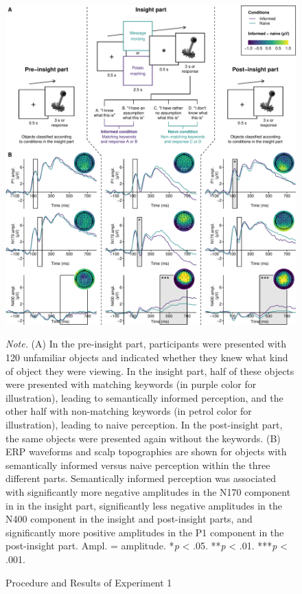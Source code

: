 \documentclass[
  english,
  doc,12pt,twoside,floatsintext]{apa7}
\begin{document}
\begin{figure}

\caption{Procedure and Results of Experiment 1\smallskip}\label{fig:exp1-plot}

{\centering \includegraphics[width=1\linewidth]{master_thesis_files/figure-latex/exp1-plot-1} 

}

\bigskip\small\emph{Note.} 
(A) In the pre-insight part, participants were presented with 120 unfamiliar objects and indicated whether they knew what kind of object they were viewing. In the insight part, half of these objects were presented with matching keywords (in purple color for illustration), leading to semantically informed perception, and the other half with non-matching keywords (in petrol color for illustration), leading to naive perception. In the post-insight part, the same objects were presented again without the keywords. (B) ERP waveforms and scalp topographies are shown for objects with semantically informed versus naive perception within the three different parts. Semantically informed perception was associated with significantly more negative amplitudes in the N170 component in in the insight part, significantly less negative amplitudes in the N400 component in the insight and post-insight parts, and significantly more positive amplitudes in the P1 component in the post-insight part. Ampl. = amplitude.\newline
*\emph{p} \textless{} .05. **\emph{p} \textless{} .01. ***\emph{p} \textless{} .001.

\end{figure}
\end{document}
